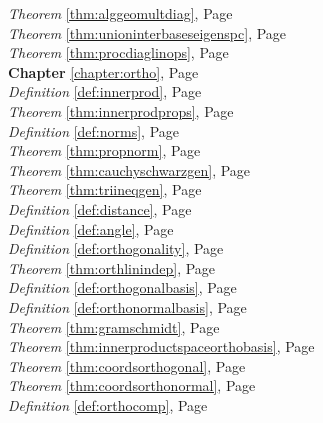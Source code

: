 \begin{multicols}{3}
\begin{center}
      \textit{Theorem} \ref{thm:alggeomultdiag}, Page \pageref{thm:alggeomultdiag} \\
      \textit{Theorem} \ref{thm:unioninterbaseseigenspc}, Page \pageref{thm:unioninterbaseseigenspc} \\
      \textit{Theorem} \ref{thm:procdiaglinops}, Page \pageref{thm:procdiaglinops} \\
      \textbf{Chapter} \ref{chapter:ortho}, Page \pageref{chapter:ortho} \\
      \textit{Definition} \ref{def:innerprod}, Page \pageref{def:innerprod} \\
      \textit{Theorem} \ref{thm:innerprodprops}, Page \pageref{thm:innerprodprops} \\
      \textit{Definition} \ref{def:norms}, Page \pageref{def:norms} \\
      \textit{Theorem} \ref{thm:propnorm}, Page \pageref{thm:propnorm} \\
      \textit{Theorem} \ref{thm:cauchyschwarzgen}, Page \pageref{thm:cauchyschwarzgen} \\
      \textit{Theorem} \ref{thm:triineqgen}, Page \pageref{thm:triineqgen} \\
      \textit{Definition} \ref{def:distance}, Page \pageref{def:distance} \\
      \textit{Definition} \ref{def:angle}, Page \pageref{def:angle} \\
      \textit{Definition} \ref{def:orthogonality}, Page \pageref{def:orthogonality} \\
      \textit{Theorem} \ref{thm:orthlinindep}, Page \pageref{thm:orthlinindep} \\
      \textit{Definition} \ref{def:orthogonalbasis}, Page \pageref{def:orthogonalbasis} \\
      \textit{Definition} \ref{def:orthonormalbasis}, Page \pageref{def:orthonormalbasis} \\
      \textit{Theorem} \ref{thm:gramschmidt}, Page \pageref{thm:gramschmidt} \\
      \textit{Theorem} \ref{thm:innerproductspaceorthobasis}, Page \pageref{thm:innerproductspaceorthobasis} \\
      \textit{Theorem} \ref{thm:coordsorthogonal}, Page \pageref{thm:coordsorthogonal} \\
      \textit{Theorem} \ref{thm:coordsorthonormal}, Page \pageref{thm:coordsorthonormal} \\
      \textit{Definition} \ref{def:orthocomp}, Page \pageref{def:orthocomp} \\

\end{center}
\end{multicols}
